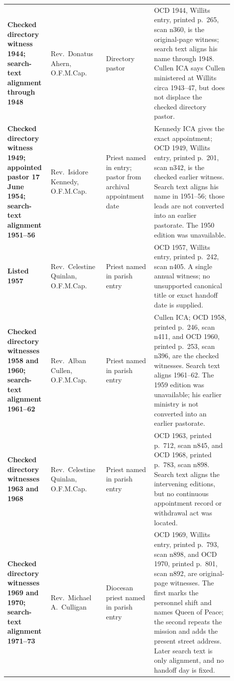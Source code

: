 \begin{longtable}{>{\bfseries\RaggedRight\arraybackslash}p{0.15\linewidth}>{\RaggedRight\arraybackslash}p{0.23\linewidth}>{\RaggedRight\arraybackslash}p{0.20\linewidth}>{\RaggedRight\arraybackslash}p{0.33\linewidth}}
Checked directory witness 1944; search-text alignment through 1948 & Rev.~Donatus Ahern, O.F.M.Cap. & Directory pastor & OCD 1944, Willits entry, printed p.~265, scan n360, is the original-page witness; search text aligns his name through 1948. Cullen ICA says Cullen ministered at Willits circa 1943--47, but does not displace the checked directory pastor.\\

Checked directory witness 1949; appointed pastor 17 June 1954; search-text alignment 1951--56 & Rev.~Isidore Kennedy, O.F.M.Cap. & Priest named in entry; pastor from archival appointment date & Kennedy ICA gives the exact appointment; OCD 1949, Willits entry, printed p.~201, scan n342, is the checked earlier witness. Search text aligns his name in 1951--56; those leads are not converted into an earlier pastorate. The 1950 edition was unavailable.\\

Listed 1957 & Rev.~Celestine Quinlan, O.F.M.Cap. & Priest named in parish entry & OCD 1957, Willits entry, printed p.~242, scan n405. A single annual witness; no unsupported canonical title or exact handoff date is supplied.\\

Checked directory witnesses 1958 and 1960; search-text alignment 1961--62 & Rev.~Alban Cullen, O.F.M.Cap. & Priest named in parish entry & Cullen ICA; OCD 1958, printed p.~246, scan n411, and OCD 1960, printed p.~253, scan n396, are the checked witnesses. Search text aligns 1961--62. The 1959 edition was unavailable; his earlier ministry is not converted into an earlier pastorate.\\

Checked directory witnesses 1963 and 1968 & Rev.~Celestine Quinlan, O.F.M.Cap. & Priest named in parish entry & OCD 1963, printed p.~712, scan n845, and OCD 1968, printed p.~783, scan n898. Search text aligns the intervening editions, but no continuous appointment record or withdrawal act was located.\\

Checked directory witnesses 1969 and 1970; search-text alignment 1971--73 & Rev.~Michael A.~Culligan & Diocesan priest named in parish entry & OCD 1969, Willits entry, printed p.~793, scan n898, and OCD 1970, printed p.~801, scan n892, are original-page witnesses. The first marks the personnel shift and names Queen of Peace; the second repeats the mission and adds the present street address. Later search text is only alignment, and no handoff day is fixed.\\


\end{longtable}
